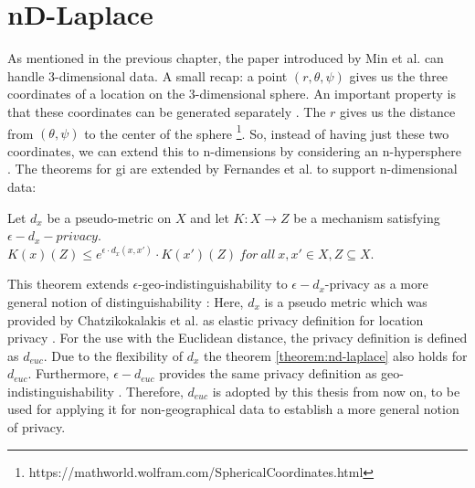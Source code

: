 \section{nD-Laplace}
As mentioned in the previous chapter, the paper introduced by Min et al. can handle 3-dimensional data.
A small recap: a point $(r, \theta, \psi)$ gives us the three coordinates of a location on the 3-dimensional sphere.
An important property is that these coordinates can be generated separately \citep{DBLP:journals/corr/abs-1212-1984, 9646489}.
The $r$ gives us the distance from $(\theta, \psi)$ to the center of the sphere \footnote{https://mathworld.wolfram.com/SphericalCoordinates.html}.
So, instead of having just these two coordinates, we can extend this to n-dimensions by considering an n-hypersphere \citep{fernandes_generalised_2019, 9646489}.
The theorems for \gls{gi} are extended by Fernandes et al. to support n-dimensional data:
\begin{theorem}
  Let $d_x$ be a pseudo-metric on $X$ and let $K: X \rightarrow Z$ be a mechanism satisfying $\epsilon-d_x-privacy$. \\
  $K(x)(Z) \leq e^{\epsilon \cdot d_x (x, x')} \cdot K(x')(Z) \ for \ all \ x, x' \in X, Z \subseteq X$.
  \label{theorem:nd-laplace}
\end{theorem}
This theorem extends $\epsilon$-geo-indistinguishability to $\epsilon-d_x$-privacy as a more general notion of distinguishability \citep{fernandes_generalised_2019}:
Here, $d_x$ is a pseudo metric which was provided by Chatzikokalakis et al. as elastic privacy definition for location privacy \citep{chatzikokolakis_constructing_2015}. For the use with the Euclidean distance, the privacy definition is defined as $d_{euc}$. Due to the flexibility of $d_x$ the theorem \ref{theorem:nd-laplace} also holds for $d_{euc}$.  Furthermore, $\epsilon-d_{euc}$ provides the same privacy definition as geo-indistinguishability \citep{chatzikokolakis_constructing_2015}.
Therefore, $d_{euc}$ is adopted by this thesis from now on, to be used for applying it for non-geographical data to establish a more general notion of privacy. \newline

